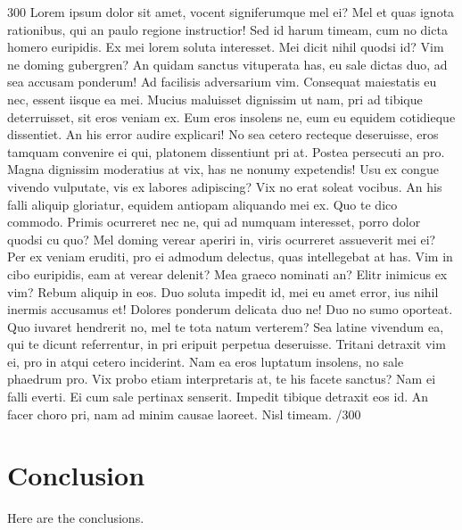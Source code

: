 \documentclass{sigchi}
\begin{document}
300 Lorem ipsum dolor sit amet, vocent signiferumque mel ei? Mel et quas ignota rationibus, qui an paulo regione instructior! Sed id harum timeam, cum no dicta homero euripidis. Ex mei lorem soluta interesset. Mei dicit nihil quodsi id? Vim ne doming gubergren? An quidam sanctus vituperata has, eu sale dictas duo, ad sea accusam ponderum! Ad facilisis adversarium vim. Consequat maiestatis eu nec, essent iisque ea mei. Mucius maluisset dignissim ut nam, pri ad tibique deterruisset, sit eros veniam ex. Eum eros insolens ne, eum eu equidem cotidieque dissentiet. An his error audire explicari! No sea cetero recteque deseruisse, eros tamquam convenire ei qui, platonem dissentiunt pri at. Postea persecuti an pro. Magna dignissim moderatius at vix, has ne nonumy expetendis! Usu ex congue vivendo vulputate, vis ex labores adipiscing? Vix no erat soleat vocibus. An his falli aliquip gloriatur, equidem antiopam aliquando mei ex. Quo te dico commodo. Primis ocurreret nec ne, qui ad numquam interesset, porro dolor quodsi cu quo? Mel doming verear aperiri in, viris ocurreret assueverit mei ei? Per ex veniam eruditi, pro ei admodum delectus, quas intellegebat at has. Vim in cibo euripidis, eam at verear delenit? Mea graeco nominati an? Elitr inimicus ex vim? Rebum aliquip in eos. Duo soluta impedit id, mei eu amet error, ius nihil inermis accusamus et! Dolores ponderum delicata duo ne! Duo no sumo oporteat. Quo iuvaret hendrerit no, mel te tota natum verterem? Sea latine vivendum ea, qui te dicunt referrentur, in pri eripuit perpetua deseruisse. Tritani detraxit vim ei, pro in atqui cetero inciderint. Nam ea eros luptatum insolens, no sale phaedrum pro. Vix probo etiam interpretaris at, te his facete sanctus? Nam ei falli everti. Ei cum sale pertinax senserit. Impedit tibique detraxit eos id. An facer choro pri, nam ad minim causae laoreet. Nisl timeam. /300

\section{Conclusion}
Here are the conclusions.
\end{document}
